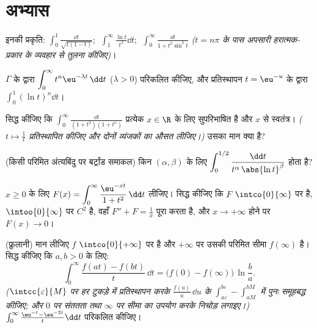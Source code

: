 \section{अभ्यास}

\begin{exercise}[$\star$]\label{exo:b2:integration:1}
इनकी प्रकृति:
$\displaystyle\int_0^1 \frac{\dd t}{\sqrt{t(1-t)}}$;
$\;\displaystyle\int_1^\infty \frac{\ln t}{t^2}\dd t$;
$\;\displaystyle\int_0^\infty \frac{\dd t}{1 + t^2\sin^2 t}$
\emph{($t =
n\pi$ के पास अपसारी हरात्मक-प्रकार के व्यवहार से तुलना कीजिए)}।
\end{exercise}

\begin{exercise}[$\star$]\label{exo:b2:integration:2}
$\Gamma$ के द्वारा $\displaystyle\int_0^\infty t^n \eu^{-\lambda t}\,\dd t$ ($\lambda > 0$) परिकलित कीजिए, और प्रतिस्थापन $t =
\eu^{-u}$ के द्वारा $\displaystyle\int_0^1 (\ln t)^n \dd t$।
\end{exercise}

\begin{exercise}[$\star$]\label{exo:b2:integration:3}
सिद्ध कीजिए कि $\displaystyle\int_0^{\infty} \frac{\dd t}{(1 +
t^2)(1 + t^x)}$ प्रत्येक $x \in \R$ के लिए सुपरिभाषित है और $x$ से स्वतंत्र।
\emph{($t \mapsto \frac1t$ प्रतिस्थापित कीजिए और दोनों व्यंजकों का औसत लीजिए।)} उसका मान
क्या है?
\end{exercise}

\begin{exercise}[$\star\star$]\label{exo:b2:integration:4}
(किसी परिमित अंत्यबिंदु पर बर्ट्रांड समाकल) किन $(\alpha,
\beta)$ के लिए $\displaystyle\int_0^{1/2}
\frac{\dd t}{t^\alpha\,\abs{\ln t}^\beta}$ 
होता है?
\end{exercise}

\begin{exercise}[$\star\star$]\label{exo:b2:integration:5}
$x \geq 0$ के लिए $F(x) = \displaystyle\int_0^{\infty} \frac{\eu^{-xt}}{1 +
t^2}\,\dd t$ लीजिए। सिद्ध कीजिए कि $F$ $\intco{0}{\infty}$ पर  है, $\intoo{0}{\infty}$ पर $C^2$ है,
वहाँ $F'' +
F = \frac1x$ पूरा करता है, और $x \to +\infty$ होने पर $F(x) \to 0$।
\end{exercise}

\begin{exercise}[$\star\star$]\label{exo:b2:integration:6}
(फ्रुलानी) मान लीजिए $f$ $\intco{0}{+\infty}$ पर  है और $+\infty$ पर उसकी परिमित सीमा $f(\infty)$
है। सिद्ध कीजिए कि $a, b > 0$ के लिए:
\[
\int_0^{\infty} \frac{f(at) - f(bt)}{t}\,\dd t
= \bigl(f(0) - f(\infty)\bigr)\,\ln\frac ba .
\]
\emph{($\intcc{\varepsilon}{M}$ पर हर टुकड़े में प्रतिस्थापन करके $\frac{f(u)}u\,\dd u$ के $\int_{a\varepsilon}^{b\varepsilon} -
\int_{aM}^{bM}$ में पुनः समूहबद्ध
कीजिए; और $0$ पर संततता तथा $\infty$ पर सीमा का उपयोग करके निचोड़ लगाइए।)}
$\int_0^\infty \frac{\eu^{-t} - \eu^{-2t}}{t}\dd t$ परिकलित कीजिए।
\end{exercise}

